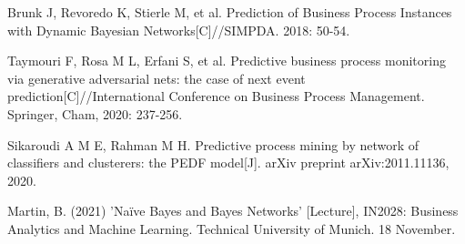 \documentclass[runningheads]{llncs}
\begin{document}
\begin{thebibliography}{99}
	Brunk J, Revoredo K, Stierle M, et al. Prediction of Business Process Instances with Dynamic Bayesian Networks[C]//SIMPDA. 2018: 50-54.
	
	Taymouri F, Rosa M L, Erfani S, et al. Predictive business process monitoring via generative adversarial nets: the case of next event prediction[C]//International Conference on Business Process Management. Springer, Cham, 2020: 237-256.
	
	Sikaroudi A M E, Rahman M H. Predictive process mining by network of classifiers and clusterers: the PEDF model[J]. arXiv preprint arXiv:2011.11136, 2020.
	
	Martin, B. (2021) 'Naïve Bayes and Bayes Networks' [Lecture], IN2028: Business Analytics and Machine Learning. Technical University of Munich. 18 November.
		
	\end{thebibliography}

	
\end{document}
